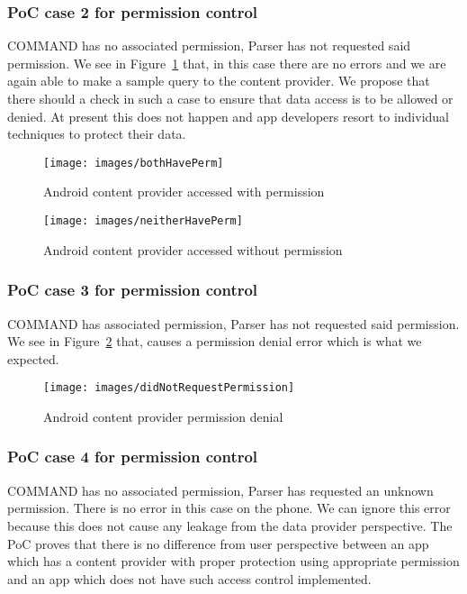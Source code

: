 \subsubsection{PoC case 2 for permission control} COMMAND has no associated permission, Parser has not requested said permission. We see in Figure~\ref{fig:neitherHavePerm} that, in this case there are no errors and we are again able to make a sample query to the content provider. We propose that there should a check in such a case to ensure that data access is to be allowed or denied. At present this does not happen and app developers resort to individual techniques to protect their data.
\begin{figure}
\centering
\begin{minipage}{.45\columnwidth}
	\texttt{[image: images/bothHavePerm]}
	\caption{Android content provider accessed with permission}
	\label{fig:bothHavePerm}
\end{minipage}
\hspace{.05\linewidth}
\begin{minipage}{.45\columnwidth}
	\texttt{[image: images/neitherHavePerm]}
	\caption{Android content provider accessed without permission}
	\label{fig:neitherHavePerm}
\end{minipage}
\end{figure}
\subsubsection{PoC case 3 for permission control} COMMAND has associated permission, Parser has not requested said permission. We see in Figure~\ref{fig:didNotRequestPermission} that, causes a permission denial error which is what we expected.
\begin{figure}[tb]
\centering
	\texttt{[image: images/didNotRequestPermission]}
	\caption{Android content provider permission denial}
	\label{fig:didNotRequestPermission}
\end{figure}
\subsubsection{PoC case 4 for permission control} COMMAND has no associated permission, Parser has requested an unknown permission. There is no error in this case on the phone. We can ignore this error because this does not cause any leakage from the data provider perspective. The PoC proves that there is no difference from user perspective between an app which has a content provider with proper protection using appropriate permission and an app which does not have such access control implemented.

